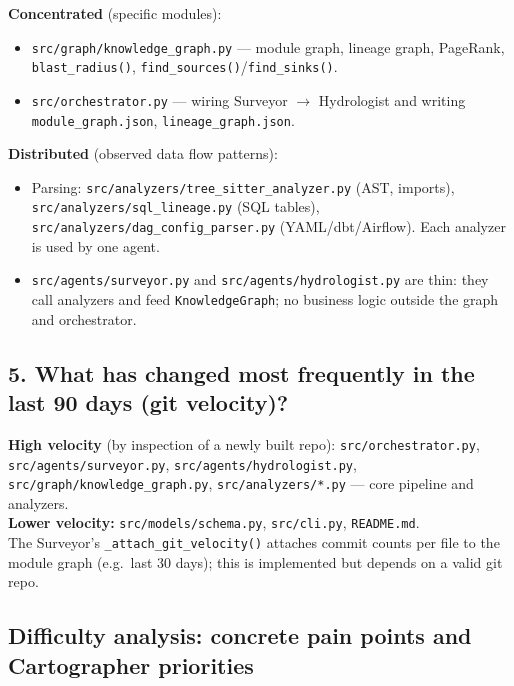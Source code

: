\documentclass[11pt,a4paper]{article}
\begin{document}
\textbf{Concentrated} (specific modules):
\begin{itemize}[noitemsep]
  \item \texttt{src/graph/knowledge\_graph.py} — module graph, lineage graph, PageRank, \texttt{blast\_radius()}, \texttt{find\_sources()}/\texttt{find\_sinks()}.
  \item \texttt{src/orchestrator.py} — wiring Surveyor $\rightarrow$ Hydrologist and writing \texttt{module\_graph.json}, \texttt{lineage\_graph.json}.
\end{itemize}

\textbf{Distributed} (observed data flow patterns):
\begin{itemize}[noitemsep]
  \item Parsing: \texttt{src/analyzers/tree\_sitter\_analyzer.py} (AST, imports), \texttt{src/analyzers/sql\_lineage.py} (SQL tables), \texttt{src/analyzers/dag\_config\_parser.py} (YAML/dbt/Airflow). Each analyzer is used by one agent.
  \item \texttt{src/agents/surveyor.py} and \texttt{src/agents/hydrologist.py} are thin: they call analyzers and feed \texttt{KnowledgeGraph}; no business logic outside the graph and orchestrator.
\end{itemize}

\subsection{5. What has changed most frequently in the last 90 days (git velocity)?}

\textbf{High velocity} (by inspection of a newly built repo): \texttt{src/orchestrator.py}, \texttt{src/agents/surveyor.py}, \texttt{src/agents/hydrologist.py}, \texttt{src/graph/knowledge\_graph.py}, \texttt{src/analyzers/*.py} — core pipeline and analyzers.\\
\textbf{Lower velocity:} \texttt{src/models/schema.py}, \texttt{src/cli.py}, \texttt{README.md}.\\
The Surveyor's \texttt{\_attach\_git\_velocity()} attaches commit counts per file to the module graph (e.g.\ last 30 days); this is implemented but depends on a valid git repo.

\subsection{Difficulty analysis: concrete pain points and Cartographer priorities}
\end{document}

